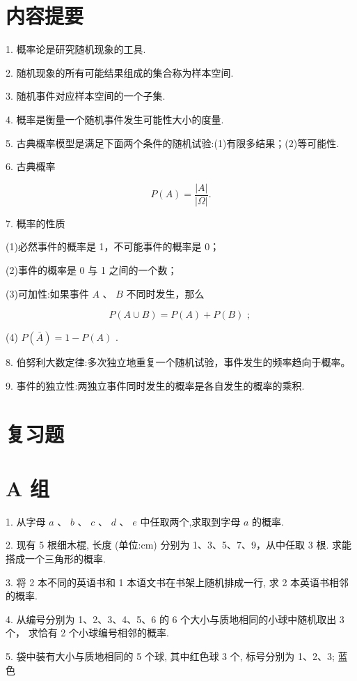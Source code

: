 \documentclass[10pt]{article}
\begin{document}
\section*{内容提要}

1. 概率论是研究随机现象的工具.

2. 随机现象的所有可能结果组成的集合称为样本空间.

3. 随机事件对应样本空间的一个子集.

4. 概率是衡量一个随机事件发生可能性大小的度量.

5. 古典概率模型是满足下面两个条件的随机试验:(1)有限多结果；(2)等可能性.

6. 古典概率

\[
P\left( A\right)  = \frac{\left| A\right| }{\left| \Omega \right| }.
\]

7. 概率的性质

(1)必然事件的概率是 1，不可能事件的概率是 0；

(2)事件的概率是 0 与 1 之间的一个数；

(3)可加性:如果事件 \(A\) 、 \(B\) 不同时发生，那么

\[
P\left( {A \cup  B}\right)  = P\left( A\right)  + P\left( B\right) \text{ ; }
\]

(4) \(P\left( \bar{A}\right)  = 1 - P\left( A\right)\) .

8. 伯努利大数定律:多次独立地重复一个随机试验，事件发生的频率趋向于概率。

9. 事件的独立性:两独立事件同时发生的概率是各自发生的概率的乘积.

\section*{复习题}

\section*{A 组}

1. 从字母 \(a\text{ 、 }b\text{ 、 }c\text{ 、 }d\text{ 、 }e\) 中任取两个,求取到字母 \(a\) 的概率.

2. 现有 5 根细木棍, 长度 (单位:cm) 分别为 1、3、5、7、9，从中任取 3 根. 求能搭成一个三角形的概率.

3. 将 2 本不同的英语书和 1 本语文书在书架上随机排成一行, 求 2 本英语书相邻的概率.

4. 从编号分别为 1、2、3、4、5、6 的 6 个大小与质地相同的小球中随机取出 3 个， 求恰有 2 个小球编号相邻的概率.

5. 袋中装有大小与质地相同的 5 个球, 其中红色球 3 个, 标号分别为 1、2、3; 蓝色
\end{document}
